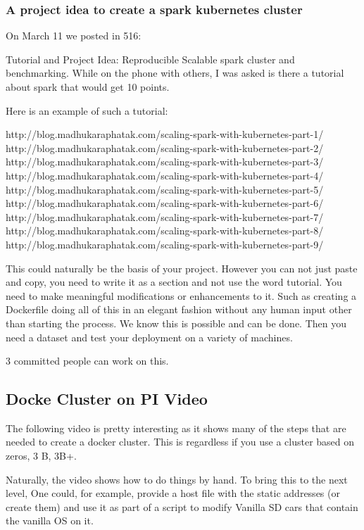 \subsubsection{A project idea to create a spark kubernetes cluster}

On March 11 we posted in 516:


Tutorial and Project Idea: Reproducible Scalable spark cluster and
benchmarking. While on the phone with others, I was asked is there a
tutorial about spark that would get 10 points.

Here is an example of such a tutorial:

http://blog.madhukaraphatak.com/scaling-spark-with-kubernetes-part-1/  
http://blog.madhukaraphatak.com/scaling-spark-with-kubernetes-part-2/ 
http://blog.madhukaraphatak.com/scaling-spark-with-kubernetes-part-3/ 
http://blog.madhukaraphatak.com/scaling-spark-with-kubernetes-part-4/ 
http://blog.madhukaraphatak.com/scaling-spark-with-kubernetes-part-5/ 
http://blog.madhukaraphatak.com/scaling-spark-with-kubernetes-part-6/ 
http://blog.madhukaraphatak.com/scaling-spark-with-kubernetes-part-7/ 
http://blog.madhukaraphatak.com/scaling-spark-with-kubernetes-part-8/ 
http://blog.madhukaraphatak.com/scaling-spark-with-kubernetes-part-9/ 

This could naturally be the basis of your project. However you can not
just paste and copy, you need to write it as a section and not use the
word tutorial. You need to make meaningful modifications or
enhancements to it. Such as creating a Dockerfile doing all of this in
an elegant fashion without any human input other than starting the
process. We know this is possible and can be done. Then you need a
dataset and test your deployment on a variety of machines.
 
3 committed people can work on this.


\subsection{Docke Cluster on PI Video}

The following video is pretty interesting as it shows many of the
steps that are needed to create a docker cluster. This is regardless
if you use a cluster based on zeros, 3 B, 3B+.


Naturally, the video shows how to do things by hand. To bring this to
the next level, One could, for example, provide a host file with the
static addresses (or create them) and use it as part of a script to
modify Vanilla SD cars that contain the vanilla OS on it.

